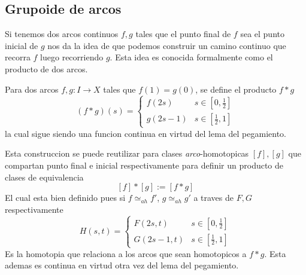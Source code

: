 \subsection{Grupoide de arcos}
Si tenemos dos arcos continuos \(f,g\) tales que el punto final de \(f\)
sea el punto inicial de \(g\) nos da la idea de que podemos construir un
camino continuo que recorra \(f\) luego recorriendo \(g\). Esta idea es
conocida formalmente como el producto de dos arcos.

\begin{definicion}
Para dos arcos \(f,g : I \to X\) tales que
\(f(1) = g(0)\), se define el producto \(f * g \)
\[ (f*g) (s) = \begin{cases}
    f(2s) & s \in [0,\frac{1}{2}] \\
    g(2s - 1) & s \in [\frac{1}{2} , 1]
  \end{cases}
\]
la cual sigue siendo una funcion continua en virtud del lema del
pegamiento.
\end{definicion}

Esta construccion se puede reutilizar para clases
\emph{arco}-homotopicas \([f],[g]\) que compartan punto final e inicial
respectivamente para definir un producto de clases de equivalencia
\[ [f] * [g] := [f * g]\]
El cual esta bien definido pues si \(f \simeq_{ah} f'\), \(g \simeq_{ah}
g'\) a traves de \(F, G\) respectivamente
\[H(s,t) = \begin{cases}
    F(2s,t) & s \in [0, \frac{1}{2}] \\
    G(2s - 1, t) & s \in [\frac{1}{2} , 1]
  \end{cases}
\]
Es la homotopia que relaciona a los arcos que sean homotopicos a
\(f*g\). Esta ademas es continua en virtud otra vez del lema del pegamiento.

